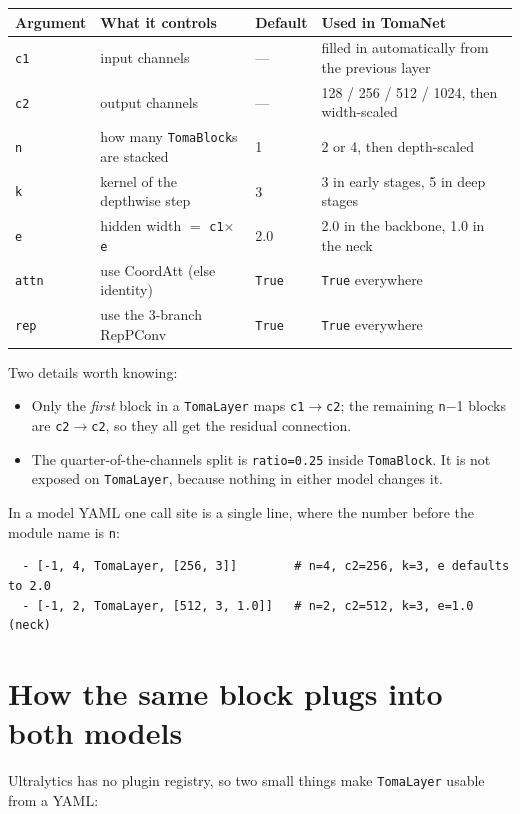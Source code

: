 \documentclass[11pt,a4paper]{article}
\newcommand{\tl}{\texttt{TomaLayer}}
\newcommand{\tb}{\texttt{TomaBlock}}
\begin{document}
\begin{center}
\small
\begin{tabular}{@{}llll@{}}
\toprule
\textbf{Argument} & \textbf{What it controls} & \textbf{Default} & \textbf{Used in TomaNet} \\
\midrule
\texttt{c1} & input channels & --- & filled in automatically from the previous layer \\
\texttt{c2} & output channels & --- & 128 / 256 / 512 / 1024, then width-scaled \\
\texttt{n}  & how many \tb{}s are stacked & 1 & 2 or 4, then depth-scaled \\
\texttt{k}  & kernel of the depthwise step & 3 & 3 in early stages, 5 in deep stages \\
\texttt{e}  & hidden width $=$ \texttt{c1}$\times$\texttt{e} & 2.0 & 2.0 in the backbone, 1.0 in the neck \\
\texttt{attn} & use CoordAtt (else identity) & \texttt{True} & \texttt{True} everywhere \\
\texttt{rep}  & use the 3-branch RepPConv & \texttt{True} & \texttt{True} everywhere \\
\bottomrule
\end{tabular}
\end{center}

\vspace{4pt}
\noindent Two details worth knowing:
\begin{itemize}
  \item Only the \emph{first} block in a \tl{} maps \texttt{c1}$\to$\texttt{c2}; the
    remaining \texttt{n}$-$1 blocks are \texttt{c2}$\to$\texttt{c2}, so they all get the
    residual connection.
  \item The quarter-of-the-channels split is \texttt{ratio=0.25} inside \tb{}. It is not
    exposed on \tl{}, because nothing in either model changes it.
\end{itemize}

\noindent In a model YAML one call site is a single line, where the number before the
module name is \texttt{n}:

\begin{lstlisting}
  - [-1, 4, TomaLayer, [256, 3]]        # n=4, c2=256, k=3, e defaults to 2.0
  - [-1, 2, TomaLayer, [512, 3, 1.0]]   # n=2, c2=512, k=3, e=1.0  (neck)
\end{lstlisting}

\section{How the same block plugs into both models}
Ultralytics has no plugin registry, so two small things make \tl{} usable from a YAML:
\end{document}
